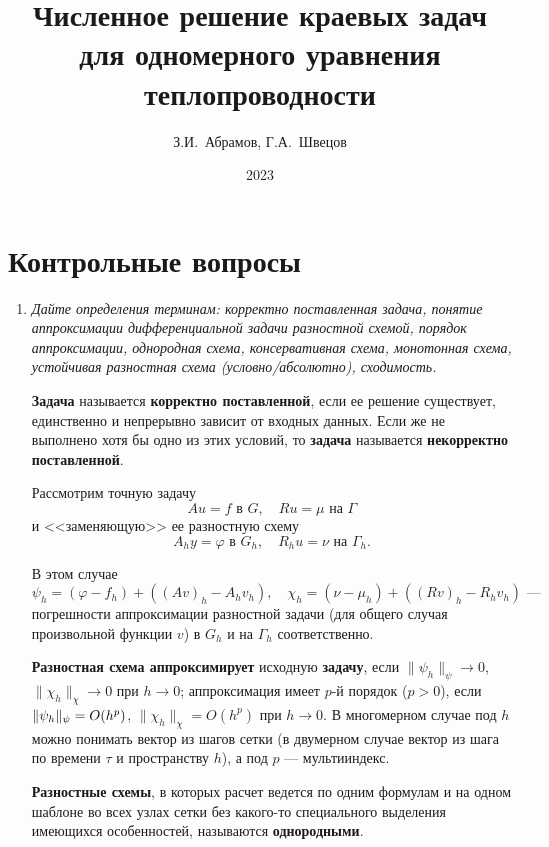 \documentclass[12pt, a4paper]{article}
\title{Численное решение краевых задач для одномерного уравнения теплопроводности}
\author{З.И.~Абрамов, Г.А.~Швецов}
\date{2023}
\begin{document}
	\newcommand{\pl}{\partial}
	\maketitle
	
	\tableofcontents
	
	\newpage
	
	\section{Контрольные вопросы}
	\begin{enumerate}
		\item \textit{Дайте определения терминам: корректно поставленная задача, понятие аппроксимации дифференциальной задачи разностной схемой, порядок аппроксимации, однородная схема, консервативная схема, монотонная схема, устойчивая разностная схема (условно/абсолютно), сходимость.}
		\smallskip
		
		\textbf{Задача} называется \textbf{корректно поставленной}, если ее решение существует, единственно и непрерывно зависит от входных данных. Если же не выполнено хотя бы одно из этих условий, то \textbf{задача} называется \textbf{некорректно поставленной}.
		
		Рассмотрим точную задачу
		\[
		A u = f \text{ в } G, \quad R u = \mu \text{ на } \Gamma
		\]
		и <<заменяющую>> ее разностную схему
		\[
		A_h y = \varphi \text{ в } G_h, \quad R_h u = \nu \text{ на } \Gamma_h.
		\]
		
		В этом случае
		\[
		\psi_h = (\varphi - f_h) + ((A v)_h - A_h v_h), \quad \chi_h = (\nu - \mu_h) + ((R v)_h - R_h v_h) \text{ ---}
		\]
		погрешности аппроксимации разностной задачи (для общего случая произвольной функции $v$) в $G_h$ и на $\Gamma_h$ соответственно.
		
		\textbf{Разностная схема аппроксимирует} исходную \textbf{задачу}, если $\|\psi_h\|_\psi \rightarrow 0$, $\|\chi_h\|_\chi \rightarrow 0$ при $h \rightarrow 0$; аппроксимация имеет $p$-й порядок ($p > 0$), если $\|\psi_h\|_\psi \brop= O(h^p)$, $\|\chi_h\|_\chi = O(h^p)$ при $h \rightarrow 0$.
		В многомерном случае под $h$ можно понимать вектор из шагов сетки (в двумерном случае вектор из шага по времени $\tau$ и пространству $h$), а под $p$ --- мультииндекс.
		
		\textbf{Разностные схемы}, в которых расчет ведется по одним формулам и на одном шаблоне во всех узлах сетки без какого-то специального выделения имеющихся особенностей, называются \textbf{однородными}.
		

\end{enumerate}
\end{document}
